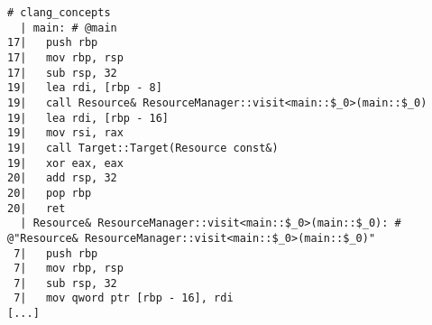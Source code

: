 \begin{lstlisting}[language={},numbers=none,title=\href{https://godbolt.org/z/_PtVRL}{\texttt{godbolt.org/z/\_PtVRL}}]
# clang_concepts 
  | main: # @main
17|   push rbp
17|   mov rbp, rsp
17|   sub rsp, 32
19|   lea rdi, [rbp - 8]
19|   call Resource& ResourceManager::visit<main::$_0>(main::$_0)
19|   lea rdi, [rbp - 16]
19|   mov rsi, rax
19|   call Target::Target(Resource const&)
19|   xor eax, eax
20|   add rsp, 32
20|   pop rbp
20|   ret
  | Resource& ResourceManager::visit<main::$_0>(main::$_0): # @"Resource& ResourceManager::visit<main::$_0>(main::$_0)"
 7|   push rbp
 7|   mov rbp, rsp
 7|   sub rsp, 32
 7|   mov qword ptr [rbp - 16], rdi
[...]
\end{lstlisting}
